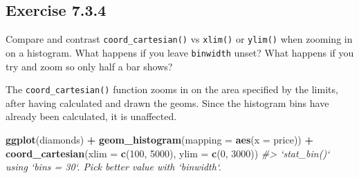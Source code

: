 \documentclass[]{book}
\newenvironment{Shaded}{\begin{snugshade}}{\end{snugshade}}
\newcommand{\CommentTok}[1]{\textcolor[rgb]{0.56,0.35,0.01}{\textit{#1}}}
\newcommand{\DataTypeTok}[1]{\textcolor[rgb]{0.13,0.29,0.53}{#1}}
\newcommand{\DecValTok}[1]{\textcolor[rgb]{0.00,0.00,0.81}{#1}}
\newcommand{\FloatTok}[1]{\textcolor[rgb]{0.00,0.00,0.81}{#1}}
\newcommand{\KeywordTok}[1]{\textcolor[rgb]{0.13,0.29,0.53}{\textbf{#1}}}
\newcommand{\NormalTok}[1]{#1}
\newcommand{\OperatorTok}[1]{\textcolor[rgb]{0.81,0.36,0.00}{\textbf{#1}}}
\newcommand{\StringTok}[1]{\textcolor[rgb]{0.31,0.60,0.02}{#1}}
\theoremstyle{plain}
\theoremstyle{remark}
\begin{document}
\begin{Shaded}
\end{Shaded}

\hypertarget{exercise-7.3.4}{%
\subsection*{\texorpdfstring{Exercise
{7.3.4}}{Exercise 7.3.4}}\label{exercise-7.3.4}}

Compare and contrast \texttt{coord\_cartesian()} vs \texttt{xlim()} or
\texttt{ylim()} when zooming in on a histogram. What happens if you
leave \texttt{binwidth} unset? What happens if you try and zoom so only
half a bar shows?

The \texttt{coord\_cartesian()} function zooms in on the area specified
by the limits, after having calculated and drawn the geoms. Since the
histogram bins have already been calculated, it is unaffected.

\begin{Shaded}
\begin{Highlighting}[]
\KeywordTok{ggplot}\NormalTok{(diamonds) }\OperatorTok{+}
\StringTok{  }\KeywordTok{geom_histogram}\NormalTok{(}\DataTypeTok{mapping =} \KeywordTok{aes}\NormalTok{(}\DataTypeTok{x =}\NormalTok{ price)) }\OperatorTok{+}
\StringTok{  }\KeywordTok{coord_cartesian}\NormalTok{(}\DataTypeTok{xlim =} \KeywordTok{c}\NormalTok{(}\DecValTok{100}\NormalTok{, }\DecValTok{5000}\NormalTok{), }\DataTypeTok{ylim =} \KeywordTok{c}\NormalTok{(}\DecValTok{0}\NormalTok{, }\DecValTok{3000}\NormalTok{))}
\CommentTok{#> `stat_bin()` using `bins = 30`. Pick better value with `binwidth`.}
\end{Highlighting}
\end{Shaded}
\end{document}
